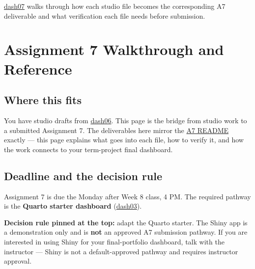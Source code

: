 \documentclass[
  letterpaper,
  DIV=11,
  numbers=noendperiod,
  oneside]{scrreprt}
\begin{document}

\href{dash07-assignment-a7-and-reference.qmd}{dash07} walks through how
each studio file becomes the corresponding A7 deliverable and what
verification each file needs before submission.

\chapter*{Assignment 7 Walkthrough and
Reference}\label{assignment-7-walkthrough-and-reference}


\section*{Where this fits}\label{where-this-fits-17}


You have studio drafts from
\hyperref[in-class-studio-dashboard-adaptation]{dash06}. This page is
the bridge from studio work to a submitted Assignment 7. The
deliverables here mirror the
\href{../../assignments/assignment07-dashboard/README.md}{A7 README}
exactly --- this page explains what goes into each file, how to verify
it, and how the work connects to your term-project final dashboard.

\section*{Deadline and the decision
rule}\label{deadline-and-the-decision-rule}


Assignment 7 is due the Monday after Week 8 class, 4 PM. The required
pathway is the \textbf{Quarto starter dashboard}
(\hyperref[starter-dashboard]{dash03}).

\textbf{Decision rule pinned at the top:} adapt the Quarto starter. The
Shiny app is a demonstration only and is \textbf{not} an approved A7
submission pathway. If you are interested in using Shiny for your
final-portfolio dashboard, talk with the instructor --- Shiny is not a
default-approved pathway and requires instructor approval.
\end{document}
